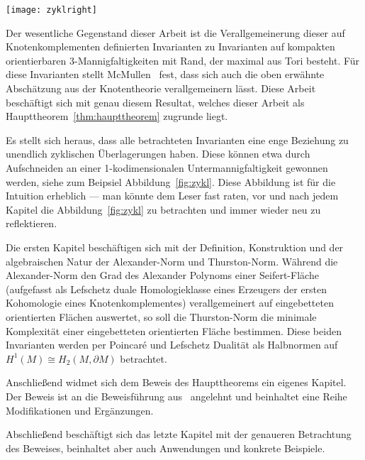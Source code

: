 	\hfill
	\begin{minipage}[t]{0.2\textwidth}
	\vfill \begin{flushright}
		\texttt{[image: zyklright]} 
	\end{flushright}
	\end{minipage}
    
	Der wesentliche Gegenstand dieser Arbeit ist die Verallgemeinerung dieser auf Knotenkomplementen definierten Invarianten zu Invarianten auf kompakten orientierbaren 3-Mannigfaltigkeiten mit Rand, der maximal aus Tori besteht. Für diese Invarianten stellt McMullen~\cite{MCMULLEN.2002} fest, dass sich auch die oben erwähnte Abschätzung aus der Knotentheorie verallgemeinern lässt. Diese Arbeit beschäftigt sich mit genau diesem Resultat, welches dieser Arbeit als Haupttheorem~\ref{thm:haupttheorem} zugrunde liegt.

    Es stellt sich heraus, dass alle betrachteten Invarianten eine enge Beziehung zu unendlich zyklischen Überlagerungen haben. Diese können etwa durch Aufschneiden an einer 1-kodimensionalen Untermannigfaltigkeit gewonnen werden, siehe zum Beipsiel Abbildung~\ref{fig:zykl}. Diese Abbildung ist für die Intuition erheblich --- man könnte dem Leser fast raten, vor und nach jedem Kapitel die Abbildung~\ref{fig:zykl} zu betrachten und immer wieder neu zu reflektieren.

	Die ersten Kapitel beschäftigen sich mit der Definition, Konstruktion und der algebraischen Natur der Alexander-Norm und Thurston-Norm. Während die Alexander-Norm den Grad des Alexander Polynoms einer Seifert-Fläche (aufgefasst als Lefschetz duale Homologieklasse eines Erzeugers der ersten Kohomologie eines Knotenkomplementes) verallgemeinert auf eingebetteten orientierten Flächen auswertet, so soll die Thurston-Norm die minimale Komplexität einer eingebetteten orientierten Fläche bestimmen. Diese beiden Invarianten werden per Poincaré und Lefschetz Dualität als Halbnormen auf $H^1(M) \cong H_2(M,\partial M)$ betrachtet.

	Anschließend widmet sich dem Beweis des Haupttheorems ein eigenes Kapitel. Der Beweis ist an die Beweisführung aus~\cite{MCMULLEN.2002} angelehnt und beinhaltet eine Reihe Modifikationen und Ergänzungen. 

	Abschließend beschäftigt sich das letzte Kapitel mit der genaueren Betrachtung des Beweises, beinhaltet aber auch Anwendungen und konkrete Beispiele.

